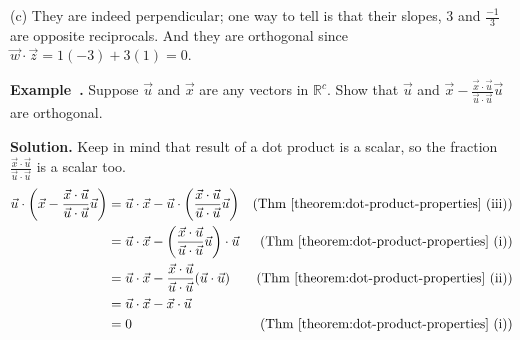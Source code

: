 \documentclass[11pt, letterpaper]{report}
\newenvironment{notes}{}{}
\newenvironment{book}{}{}
\let\originalleft\left
\let\originalright\right
\renewcommand{\left}{\mathopen{}\mathclose\bgroup\originalleft}
\renewcommand{\right}{\aftergroup\egroup\originalright}
\newcounter{example}[section]
\newcommand{\example}{\refstepcounter{example}%
\par\noindent\textbf{Example~\theexample.} }
\newcounter{theorem}[chapter]
\newcommand{\R}{\mathbb{R}}
\begin{document}
\begin{book}
(c) They are indeed perpendicular; one way to tell is that their slopes, $3$ and $\frac{-1}{3}$ are opposite reciprocals. And they are orthogonal since $\vec{w}\cdot \vec{z} = 1(-3)+3(1) =0$. 


\blacksquare
\end{book}

\example {}  Suppose $\vec{u}$ and $\vec{x}$ are any vectors in $\R^c$. Show that $\vec{u}$ and $\vec{x}- \frac{\vec{x}\cdot \vec{u}}{\vec{u}\cdot \vec{u}}\vec{u}$ are orthogonal.

\begin{book}
\textbf{Solution.} Keep in mind that result of a dot product is a scalar, so the fraction $\frac{\vec{x}\cdot \vec{u}}{\vec{u}\cdot \vec{u}}$ is a scalar too.
\begin{align*}
\vec{u}\cdot \left( \vec{x}-  \frac{\vec{x}\cdot \vec{u}}{\vec{u}\cdot \vec{u}} \vec{u}\right) &=
\vec{u}\cdot \vec{x} - \vec{u} \cdot\left( \frac{\vec{x}\cdot \vec{u}}{\vec{u}\cdot \vec{u}}\vec{u}\right) & \text{(Thm \ref{theorem:dot-product-properties} (iii))}\\ 
&= \vec{u}\cdot \vec{x} - \left( \frac{\vec{x}\cdot \vec{u}}{\vec{u}\cdot \vec{u}}\vec{u}\right) \cdot \vec{u}  & \text{(Thm \ref{theorem:dot-product-properties} (i))}\\ 
&= \vec{u}\cdot \vec{x} -  \frac{\vec{x}\cdot \vec{u}}{\vec{u}\cdot \vec{u}} \left(\vec{u}\cdot\vec{u}\right) & \text{(Thm \ref{theorem:dot-product-properties} (ii))}\\ 
&= \vec{u}\cdot \vec{x} - \vec{x}\cdot \vec{u} \\
&= 0 & \text{(Thm \ref{theorem:dot-product-properties} (i))}
\end{align*}
\blacksquare
\end{book}
\begin{notes}
\vfill \hspace{1ex}
\end{notes}
\end{document}
